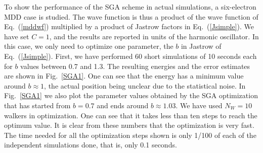 \documentclass{article}
\begin{document}
%
To show the performance of the SGA scheme in actual simulations, a
six-electron MDD case is studied. The wave function is thus a product
of the wave function of Eq.~(\ref{mddwf}) multiplied by a product of
Jastrow factors in Eq.~(\ref{Jsimple}). We have set $C=1$, and the
results are reported in units of the harmonic oscillator. In this
case, we only need to optimize one parameter, the $b$ in Jastrow of
Eq.~(\ref{Jsimple}). First, we have performed 60 short simulations of
10 seconds each for $b$ values between 0.7 and 1.3. The resulting
energies and the error estimates are shown in Fig.~\ref{SGA1}. One can
see that the energy has a minimum value around $b\approx 1$, the
actual position being unclear due to the statistical noise. In
Fig.~\ref{SGA1} we also plot the parameter values obtained by the SGA
optimization that has started from $b=0.7$ and ends around $b\approx
1.03$.  We have used $N_W=10$ walkers in optimization. One can see
that it takes less than ten steps to reach the optimum value. It is
clear from these numbers that the optimization is very fast. The time
needed for all the optimization steps shown is only 1/100 of each of
the independent simulations done, that is, only 0.1 seconds.
\end{document}
